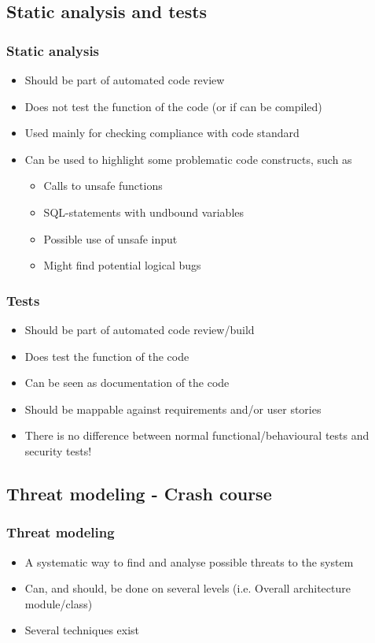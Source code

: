 \documentclass{beamer}
\begin{document}
  \subsection{Static analysis and tests}
    \begin{frame}
      \frametitle{Static analysis}
      \begin{itemize}
        \item Should be part of automated code review
        \item Does not test the function of the code (or if can be compiled)
        \item Used mainly for checking compliance with code standard
        \item Can be used to highlight some problematic code constructs, such as
        \begin{itemize}
          \item Calls to unsafe functions
          \item SQL-statements with undbound variables
          \item Possible use of unsafe input
          \item Might find potential logical bugs
        \end{itemize}
      \end{itemize}
    \end{frame}

    \begin{frame}
      \frametitle{Tests}
      \begin{itemize}
        \item Should be part of automated code review/build
        \item Does test the function of the code
        \item Can be seen as documentation of the code
        \item Should be mappable against requirements and/or user stories
        \item There is no difference between normal functional/behavioural tests and security tests!
      \end{itemize}
    \end{frame}

  \subsection{Threat modeling - Crash course}
    \begin{frame}
      \frametitle{Threat modeling}
      \begin{itemize}
        \item A systematic way to find and analyse possible threats to the system
        \item Can, and should, be done on several levels (i.e. Overall architecture \textrightarrow module/class)
        \item Several techniques exist
      \end{itemize}
    \end{frame}
\end{document}

